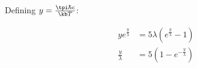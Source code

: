 \documentclass[../../PS3.tex]{subfiles}
\begin{document}
Defining $y = \frac{\tpi \hbar c }{\kb T }$:

\begin{align}
	y e^{ \frac{y}{ \lambda}}  &= 5 \lambda \left(e^{ \frac{y}{\lambda}} - 1\right) \\
	\frac{y}{\lambda} &=  5 \left(1 - e^{-  \frac{y}{\lambda}}\right) 
\end{align}

\FloatBarrier

\FloatBarrier

\FloatBarrier

\FloatBarrier
\end{document}
